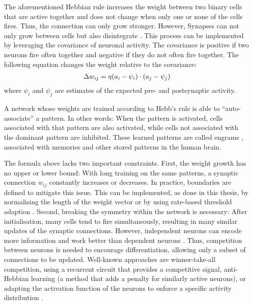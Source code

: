 The aforementioned Hebbian rule increases the weight between two binary cells that are active together and does not change when only one or none of the cells fires. Thus, the connection can only grow stronger.
However, Synapses can not only grow between cells but also disintegrate .
This process can be implemented by leveraging the covariance of neuronal activity.
The covariance is positive if two neurons fire often together and negative if they do not often fire together.
The following equation changes the weight relative to the covariance:
%
\begin{align}\eqlbl{hebb_2}
	\Delta w_{ij} = \eta (a_i - \psi_i) \cdot (a_j - \psi_j)
\end{align}
%
where \(\psi_i\) and \(\psi_j\) are estimates of the expected pre- and postsynaptic activity.

A network whose weights are trained according to Hebb's rule is able to ``auto-associate'' a pattern. In other words: When the pattern is activated, cells associated with that pattern are also activated, while cells not associated with the dominant pattern are inhibited. These learned patterns are called engrams , associated with memories and other stored patterns in the human brain.

The formula above lacks two important constraints.
First, the weight growth has no upper or lower bound: With long training on the same patterns, a synaptic connection $w_{ij}$ constantly increases or decreases. In practice, boundaries are defined to mitigate this issue. This can be implemented, as done in this thesis, by normalising the length of the weight vector  or by using rate-based threshold adaption .
Second, breaking the symmetry within the network is necessary: After initialisation, many cells tend to fire simultaneously, resulting in many similar updates of the synaptic connections. However, independent neurons can encode more information and work better than dependent neurons .
Thus, competition between neurons is needed to encourage differentiation, allowing only a subset of connections to be updated.
Well-known approaches are winner-take-all competition, using a recurrent circuit that provides a competitive signal, anti-Hebbian learning  (a method that adds a penalty for similarly active neurons), or adapting the activation function of the neurons to enforce a specific activity distribution .



